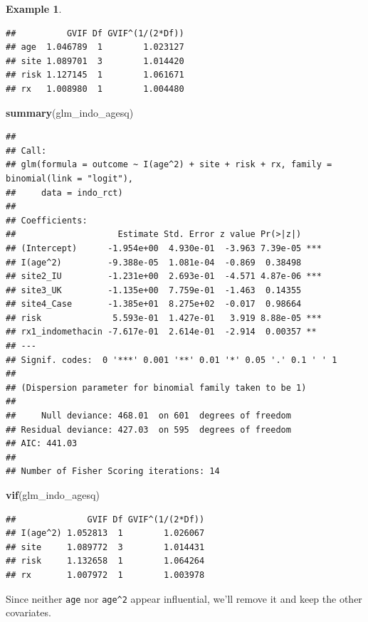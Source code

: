 \documentclass[
  openany]{book}
\newenvironment{Shaded}{\begin{snugshade}}{\end{snugshade}}
\newcommand{\FunctionTok}[1]{\textcolor[rgb]{0.13,0.29,0.53}{\textbf{#1}}}
\newcommand{\NormalTok}[1]{#1}
\theoremstyle{definition}
\theoremstyle{definition}
\newtheorem{example}{Example}[chapter]
\theoremstyle{definition}
\theoremstyle{definition}
\theoremstyle{remark}
\begin{document}
\begin{example}
\begin{verbatim}
##          GVIF Df GVIF^(1/(2*Df))
## age  1.046789  1        1.023127
## site 1.089701  3        1.014420
## risk 1.127145  1        1.061671
## rx   1.008980  1        1.004480
\end{verbatim}

\begin{Shaded}
\begin{Highlighting}[]
\FunctionTok{summary}\NormalTok{(glm\_indo\_agesq)}
\end{Highlighting}
\end{Shaded}

\begin{verbatim}
## 
## Call:
## glm(formula = outcome ~ I(age^2) + site + risk + rx, family = binomial(link = "logit"), 
##     data = indo_rct)
## 
## Coefficients:
##                    Estimate Std. Error z value Pr(>|z|)    
## (Intercept)      -1.954e+00  4.930e-01  -3.963 7.39e-05 ***
## I(age^2)         -9.388e-05  1.081e-04  -0.869  0.38498    
## site2_IU         -1.231e+00  2.693e-01  -4.571 4.87e-06 ***
## site3_UK         -1.135e+00  7.759e-01  -1.463  0.14355    
## site4_Case       -1.385e+01  8.275e+02  -0.017  0.98664    
## risk              5.593e-01  1.427e-01   3.919 8.88e-05 ***
## rx1_indomethacin -7.617e-01  2.614e-01  -2.914  0.00357 ** 
## ---
## Signif. codes:  0 '***' 0.001 '**' 0.01 '*' 0.05 '.' 0.1 ' ' 1
## 
## (Dispersion parameter for binomial family taken to be 1)
## 
##     Null deviance: 468.01  on 601  degrees of freedom
## Residual deviance: 427.03  on 595  degrees of freedom
## AIC: 441.03
## 
## Number of Fisher Scoring iterations: 14
\end{verbatim}

\begin{Shaded}
\begin{Highlighting}[]
\FunctionTok{vif}\NormalTok{(glm\_indo\_agesq)}
\end{Highlighting}
\end{Shaded}

\begin{verbatim}
##              GVIF Df GVIF^(1/(2*Df))
## I(age^2) 1.052813  1        1.026067
## site     1.089772  3        1.014431
## risk     1.132658  1        1.064264
## rx       1.007972  1        1.003978
\end{verbatim}

Since neither \texttt{age} nor \texttt{age\^{}2} appear influential, we'll remove it and keep the other covariates.


\end{example}
\end{document}
